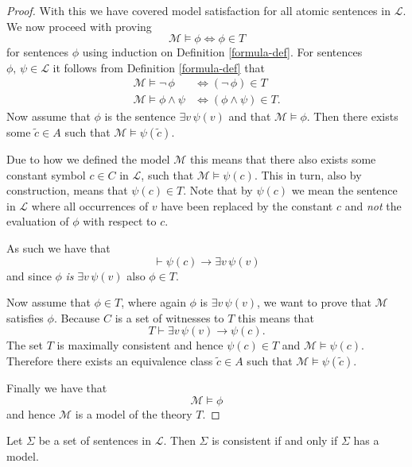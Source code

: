 \documentclass[../../main.tex]{subfiles}
\begin{document}
\begin{proof}
    With this we have covered model satisfaction for all atomic sentences in $\mathcal{L}$.
    We now proceed with proving 
    \begin{equation}\label{lemma-proof-forumula}
        \mathcal{M} \models \phi \iff \phi \in T
    \end{equation}
    for sentences $\phi$ using induction on Definition \ref{formula-def}.
    For sentences $\phi,\, \psi \in \mathcal{L}$ it follows from Definition \ref{formula-def} that
    \begin{align*}
        \mathcal{M} \models \lnot\, \phi &\iff (\lnot\, \phi) \in T \\
        \mathcal{M} \models \phi \wedge \psi &\iff (\phi \wedge \psi) \in T.
    \end{align*}
    Now assume that $\phi$ is the sentence $\exists v\, \psi(v)$ and that $\mathcal{M} \models \phi$.
    Then there exists some $\tilde{c} \in A$ such that $\mathcal{M} \models \psi(\tilde{c})$.
    
    Due to how we defined the model $\mathcal{M}$ this means that there also exists some constant symbol $c \in C$ in $\mathcal{L}$,
    such that $\mathcal{M} \models \psi(c)$.
    This in turn, also by construction, means that $\psi(c) \in T$.
    Note that by $\psi(c)$ we mean the sentence in $\mathcal{L}$ where all occurrences of $v$ have been replaced by the constant $c$ and \emph{not} the evaluation of $\phi$ with respect to $c$.
    
    As such we have that
    $$\vdash \psi(c) \rightarrow \exists v\, \psi(v)$$
    and since $\phi$ \emph{is} $\exists v\, \psi(v)$ also $\phi \in T$.

    Now assume that $\phi \in T$, where again $\phi$ is $\exists v\, \psi(v)$, we want to prove that $\mathcal{M}$ satisfies $\phi$.
    Because $C$ is a set of witnesses to $T$ this means that 
    $$T \vdash \exists v\, \psi(v) \rightarrow \psi(c).$$
    The set $T$ is maximally consistent and hence $\psi(c) \in T$ and $\mathcal{M} \models \psi(c)$.
    Therefore there exists an equivalence class $\tilde{c} \in A$ such that $\mathcal{M} \models \psi(\tilde{c})$.
    
    Finally we have that
    $$\mathcal{M} \models \phi$$
    and hence $\mathcal{M}$ is a model of the theory $T$.
\end{proof}

\begin{theorem}\cite[Theorem 1.3.21]{Cha90}
    Let $\Sigma$ be a set of sentences in $\mathcal{L}$.
    Then $\Sigma$ is consistent if and only if $\Sigma$ has a model.
\end{theorem}
\end{document}
